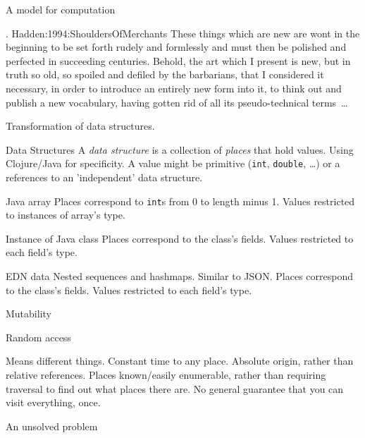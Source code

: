 \begin{plSection}{A model for computation}   

\begin{plQuote}
{.}
{Hadden:1994:ShouldersOfMerchants}
{These things which are new are wont in the beginning to 
be set 
forth rudely and formlessly and must then be polished and 
perfected in succeeding centuries. Behold, the art which I present 
is new, but in truth so old, so spoiled and defiled by the 
barbarians, that I considered it necessary, in order to introduce
an entirely new form into it, to think out and publish a new 
vocabulary, having gotten rid of all its pseudo-technical 
terms~\ldots}
\end{plQuote}

Transformation of data structures.

\begin{plSection}{Data Structures}
A \textit{data structure} is a collection of \textit{places}
that hold values. 
Using Clojure/Java for specificity.
A value might be primitive
(\texttt{int}, \texttt{double}, \ldots)
or a references to an 'independent' data structure.

\begin{plExample}{Java array}{}
Places correspond to \texttt{int}s from 0 to length minus 1.
Values restricted to instances of array's type.
\end{plExample}  

\begin{plExample}{Instance of Java class}{}
Places correspond to the class's fields.
Values restricted to each field's type.
\end{plExample}  

\begin{plExample}{EDN data}{}
Nested sequences and hashmaps. Similar to JSON.
Places correspond to the class's fields.
Values restricted to each field's type.
\end{plExample}  

\begin{plSection}{Mutability}
\end{plSection}
\begin{plSection}{Random access}

Means different things. 
Constant time to any place.
Absolute origin, rather than relative references.
Places known/easily enumerable, rather than requiring traversal
to find out what places there are.
No general guarantee that you can visit everything, once.
\end{plSection}
\begin{plSection}{An unsolved problem}


\end{plSection}
\end{plSection}
\end{plSection}
